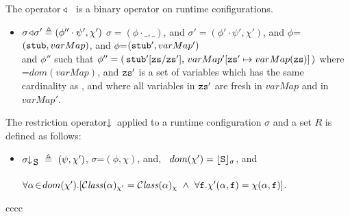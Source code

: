  

 \begin{definition}  The operator $\!\triangleleft\!$\ \  is a binary operator on runtime configurations.
 \label{def:config:adapt}
 $~ $ 
 
\begin{itemize}
\item
$\sigma \!\triangleleft\! \sigma' \triangleq (\phi''\cdot\psi',\chi')$  \IFF $\sigma=(\phi\cdot\_,\_)$, and $\sigma'= (\phi'\cdot\psi',\chi')$, and $\phi$=$({\mbox{\tt{stub}}},varMap)$, and $\phi$=$({\mbox{\tt{stub}}}',varMap')$
\\ and  $\phi''$ such that 
  $\phi''=(\, {\mbox{\tt{stub}}}'[{\mbox{\tt{zs}}}/{\mbox{\tt{zs}}}' ],\,varMap'[{\mbox{\tt{zs}}}'\mapsto varMap({\mbox{\tt{zs}}})]\, ) $
where \\
=$dom(varMap)$, and   ${\mbox{\tt{zs}}}'$ is a set  of variables which has  the  same cardinality as , and where all variables in
${\mbox{\tt{zs}}}'$  are fresh in $varMap$ and in $varMap'$.


\end{itemize}

\end{definition}

 

 \begin{definition}  The restriction operator $\!\!\downarrow\!_{} $ applied to a runtime configuration $\sigma$ and a set $R$ is defined as follows:   
 \label{def:config:restrct}
 $~ $ 
 
\begin{itemize}
\item
$\restrct {\sigma}{\prg{S}} \ \triangleq \ (\psi, \chi')$, \IFF  $\sigma$=$(\phi,\chi)$,  and, \  $dom(\chi')={\lfloor{ {{\mbox{\tt{S}}}}}\rfloor_{\sigma}}$, and  \\
$\ \strut \ \ \hspace{1.2in} $  
 $\forall \alpha\!\in\!dom(\chi').[ {\mathcal C}{\mathit{lass}}(\alpha)_{\chi'} =  {\mathcal C}{\mathit{lass}}(\alpha)_{\chi}\ \wedge \ \forall {\mbox{\tt{f}}}.  \chi'(\alpha,{\mbox{\tt{f}}})=\chi(\alpha,{\mbox{\tt{f}}})]$.
\end{itemize}
\end{definition} 

cccc

